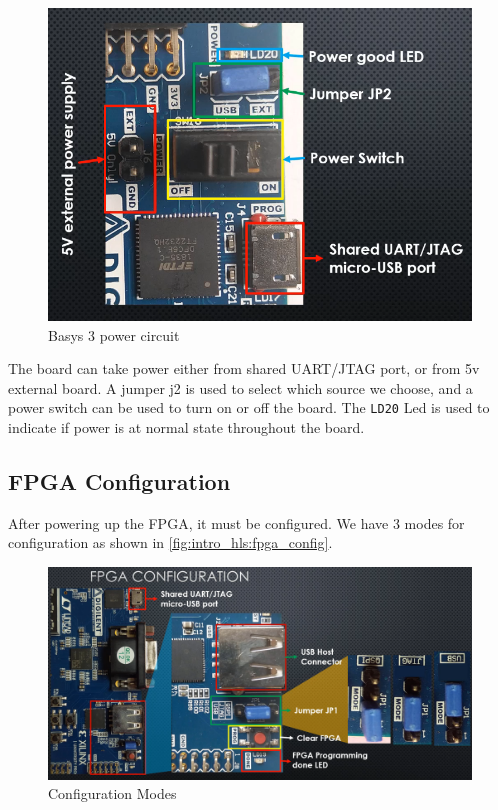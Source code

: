 \begin{figure}[h]
\centering
\includegraphics[scale=0.5,frame]{Figures/intro_hls/basys3_power}
\caption{Basys 3 power circuit}
\label{fig:intro_hls:basys3_power}
\end{figure}

The board can take power either from shared UART/JTAG port, or from 5v external board. A jumper j2 is used to select which source we choose, and a power switch can be used to turn on or off the board. The \verb|LD20| Led is used to indicate if power is at normal state throughout the board.


\newpage
\subsection{FPGA Configuration}

After powering up the FPGA, it must be configured. We have 3 modes for configuration as shown in \autoref{fig:intro_hls:fpga_config}.

\begin{figure}[h]
\centering
\includegraphics[scale=0.35,frame]{Figures/intro_hls/fpga_config}
\caption{Configuration Modes}
\label{fig:intro_hls:fpga_config}
\end{figure}


